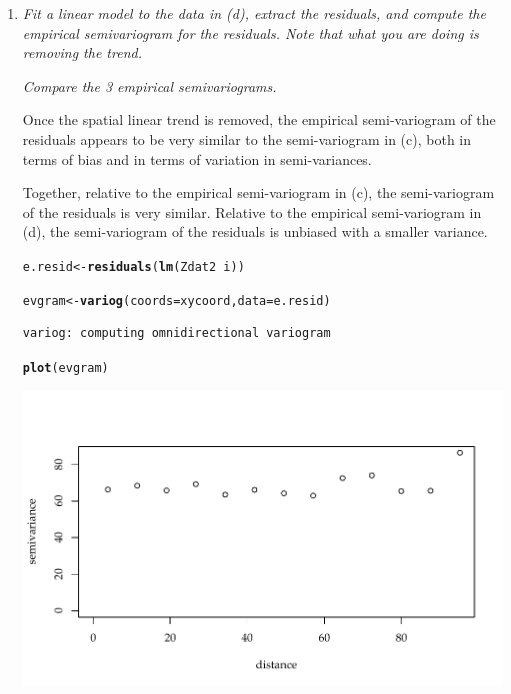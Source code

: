 \documentclass{article}\usepackage[]{graphicx}\usepackage[]{color}
\makeatletter
\def\maxwidth{ %
  \ifdim\Gin@nat@width>\linewidth
    \linewidth
  \else
    \Gin@nat@width
  \fi
}
\newcommand{\hlopt}[1]{\textcolor[rgb]{0,0,0}{#1}}%
\newcommand{\hlstd}[1]{\textcolor[rgb]{0.345,0.345,0.345}{#1}}%
\newcommand{\hlkwb}[1]{\textcolor[rgb]{0.69,0.353,0.396}{#1}}%
\newcommand{\hlkwc}[1]{\textcolor[rgb]{0.333,0.667,0.333}{#1}}%
\newcommand{\hlkwd}[1]{\textcolor[rgb]{0.737,0.353,0.396}{\textbf{#1}}}%
\newenvironment{kframe}{%
 \def\at@end@of@kframe{}%
 \ifinner\ifhmode%
  \def\at@end@of@kframe{\end{minipage}}%
  \begin{minipage}{\columnwidth}%
 \fi\fi%
 \def\FrameCommand##1{\hskip\@totalleftmargin \hskip-\fboxsep
 \colorbox{shadecolor}{##1}\hskip-\fboxsep
     \hskip-\linewidth \hskip-\@totalleftmargin \hskip\columnwidth}%
 \MakeFramed {\advance\hsize-\width
   \@totalleftmargin\z@ \linewidth\hsize
   \@setminipage}}%
 {\par\unskip\endMakeFramed%
 \at@end@of@kframe}
\newenvironment{knitrout}{}{} %
\makeatother
\begin{document}
\begin{enumerate}
\begin{enumerate}
\begin{knitrout}
{}



\end{knitrout}

\item 
{\it Fit a linear model to the data in (d), extract the residuals, and compute the empirical semivariogram for the residuals. Note that what you are doing is removing the trend.}

{\it Compare the 3 empirical semivariograms.}

Once the spatial linear trend is removed, the empirical semi-variogram of the residuals appears to be very similar to the semi-variogram in (c), both in terms of bias and in terms of variation in semi-variances. %

Together, relative to the empirical semi-variogram in (c), the semi-variogram of the residuals is very similar. Relative to the empirical semi-variogram in (d), the semi-variogram of the residuals is unbiased with a smaller variance.

\begin{knitrout}\footnotesize
{}\color{fgcolor}\begin{kframe}
\begin{alltt}
\hlstd{e.resid} \hlkwb{<-} \hlkwd{residuals}\hlstd{(}\hlkwd{lm}\hlstd{(Zdat2}\hlopt{~}\hlstd{i))}

\hlstd{evgram} \hlkwb{<-} \hlkwd{variog}\hlstd{(}\hlkwc{coords}\hlstd{=xycoord,}\hlkwc{data}\hlstd{=e.resid)}
\end{alltt}
\begin{verbatim}
variog: computing omnidirectional variogram
\end{verbatim}
\begin{alltt}
\hlkwd{plot}\hlstd{(evgram)}
\end{alltt}
\end{kframe}

{\centering \includegraphics[width=\maxwidth]{figure/prob2e-1} 

}
\end{knitrout}
\end{enumerate}
\end{enumerate}
\end{document}
